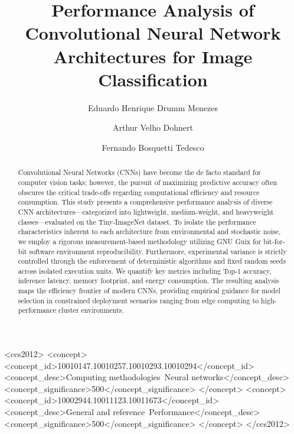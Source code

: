 \documentclass[acmsmall]{acmart}
\begin{document}
\title{Performance Analysis of Convolutional Neural Network Architectures for Image Classification}

\author{Eduardo Henrique Drumm Menezes}

\author{Arthur Velho Dohnert}

\author{Fernando Bosquetti Tedesco}

\begin{abstract}
Convolutional Neural Networks (CNNs) have become the de facto standard for computer vision tasks; however, the pursuit of maximizing predictive accuracy often obscures the critical trade-offs regarding computational efficiency and resource consumption. This study presents a comprehensive performance analysis of diverse CNN architectures—categorized into lightweight, medium-weight, and heavyweight classes—evaluated on the Tiny-ImageNet dataset. To isolate the performance characteristics inherent to each architecture from environmental and stochastic noise, we employ a rigorous measurement-based methodology utilizing GNU Guix for bit-for-bit software environment reproducibility. Furthermore, experimental variance is strictly controlled through the enforcement of deterministic algorithms and fixed random seeds across isolated execution units. We quantify key metrics including Top-1 accuracy, inference latency, memory footprint, and energy consumption. The resulting analysis maps the efficiency frontier of modern CNNs, providing empirical guidance for model selection in constrained deployment scenarios ranging from edge computing to high-performance cluster environments.
\end{abstract}

\begin{CCSXML}
<ccs2012>
   <concept>
       <concept_id>10010147.10010257.10010293.10010294</concept_id>
       <concept_desc>Computing methodologies~Neural networks</concept_desc>
       <concept_significance>500</concept_significance>
   </concept>
   <concept>
       <concept_id>10002944.10011123.10011673</concept_id>
       <concept_desc>General and reference~Performance</concept_desc>
       <concept_significance>500</concept_significance>
   </concept>
</ccs2012>
\end{CCSXML}
\end{document}
